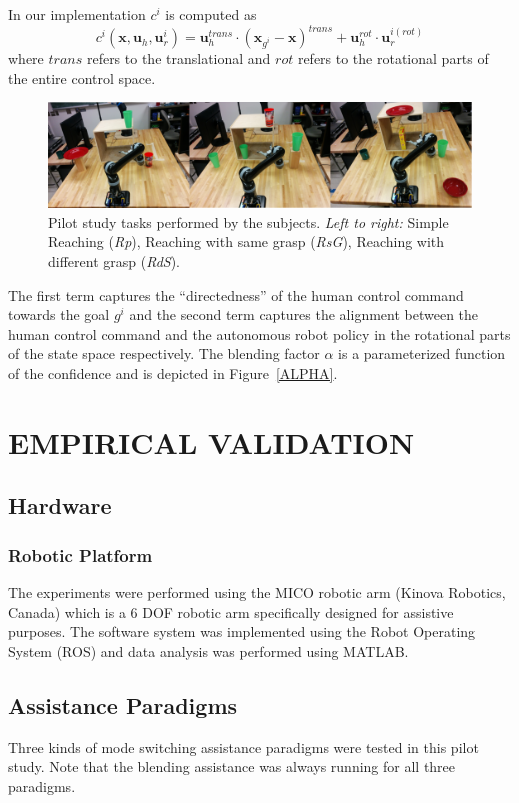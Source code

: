 \documentclass[conference]{IEEEtran}
\begin{document}
In our implementation $c^i$ is computed as
\begin{equation}\label{E1}
c^i(\boldsymbol{x}, \boldsymbol{u}_h, \boldsymbol{u}_r^i) = \boldsymbol{u}_{h}^{trans}\cdot(\boldsymbol{x}_{g^i} - \boldsymbol{x})^{trans} + \boldsymbol{u}_h^{rot}\cdot\boldsymbol{u}_r^{i(rot)}
\end{equation}
where $trans$ refers to the translational and $rot$ refers to the rotational parts of the entire control space. 
\begin{figure}[ht]
	\centering
	\includegraphics[width = 1\hsize]{./figures/TASKS.png}
	\caption{Pilot study tasks performed by the subjects. \textit{Left to right:} Simple Reaching (\textit{Rp}), Reaching with same grasp (\textit{RsG}), Reaching with different grasp (\textit{RdS}).}
	\label{TASKS}
\end{figure}
The first term captures the ``directedness'' of the human control command towards the goal $g^i$ and the second term captures the alignment between the human control command and the autonomous robot policy in the rotational parts of the state space respectively. 
The blending factor $\alpha$ is a parameterized function of the confidence and is depicted in Figure~\ref{ALPHA}.
\section{EMPIRICAL VALIDATION} \label{EV}
\subsection{Hardware}
\subsubsection{Robotic Platform}
The experiments were performed using the MICO robotic arm (Kinova Robotics, Canada) which is a 6 DOF robotic arm specifically designed for assistive purposes. The software system was implemented using the Robot Operating System (ROS) and data analysis was performed using MATLAB. 
\subsection{Assistance Paradigms}
Three kinds of mode switching assistance paradigms were tested in this pilot study. Note that the blending assistance was always running for all three paradigms.
\end{document}
